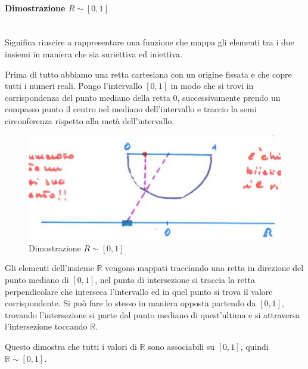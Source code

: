 \documentclass{article}
\begin{document}
\paragraph{Dimostrazione $R\sim[0,1]$}\mbox{}\\ \noindent Significa riuscire a rappresentare una funzione
che mappa gli elementi tra i due insiemi in maniera che sia suriettiva ed iniettiva.

Prima di tutto abbiamo una retta cartesiana con un origine fissata e che copre tutti i numeri reali.
Pongo l'intervallo $[0,1]$ in modo che si trovi in corrispondenza del punto mediano della retta $0$,
successivamente prendo un compasso punto il centro nel mediano dell'intervallo e traccio la
semi circonferenza rispetto alla metà dell'intervallo.
\begin{figure}[H]
    \centering
    \includegraphics[scale=0.5]{images/dim_1.png}
    \caption{Dimostrazione  $R\sim[0,1]$}
\end{figure}

Gli elementi dell'insieme $\mathbb{R}$ vengono mappati tracciando una retta in direzione del punto
mediano di $[0,1]$, nel punto di intersezione si traccia la retta perpendicolare che interseca
l'intervallo ed in quel punto si trova il valore corrispondente. Si può fare lo stesso
in maniera opposta partendo da $[0,1]$, trovando l'intersezione si parte dal punto mediano
di quest'ultima e si attraversa l'intersezione toccando $\mathbb{R}$.

Questo dimostra che tutti i valori di $\mathbb{R}$ sono associabili
su $[0,1]$, quindi $\mathbb{R}\sim[0,1]$.
\end{document}
